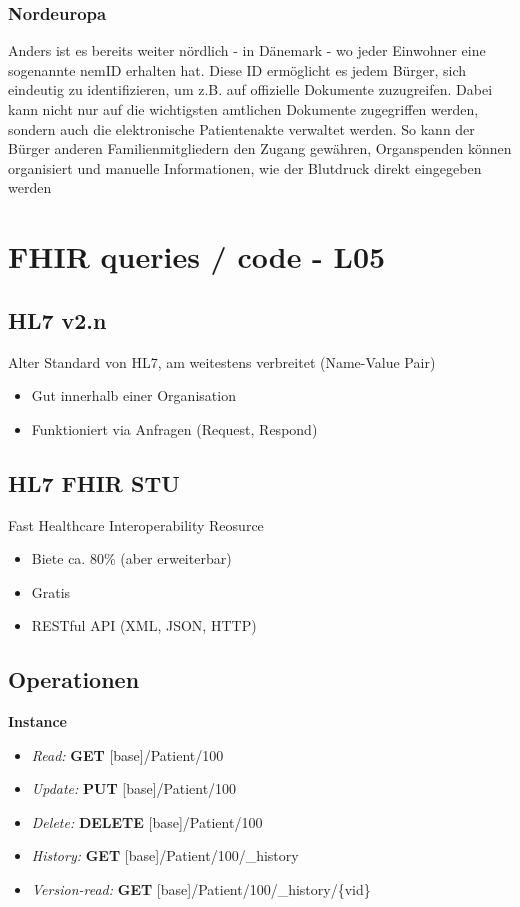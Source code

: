 \documentclass{report}
\theoremstyle{definition}
\theoremstyle{example}
\begin{document}
\subsection{Nordeuropa}
Anders ist es bereits weiter nördlich - in Dänemark - wo jeder Einwohner eine sogenannte nemID erhalten hat. Diese ID ermöglicht es jedem Bürger, sich eindeutig zu identifizieren, um z.B. auf offizielle Dokumente zuzugreifen. Dabei kann nicht nur auf die wichtigsten amtlichen Dokumente zugegriffen werden, sondern auch die elektronische Patientenakte verwaltet werden. So kann der Bürger anderen Familienmitgliedern den Zugang gewähren, Organspenden können organisiert und manuelle Informationen, wie der Blutdruck direkt eingegeben werden

\chapter{FHIR queries / code - L05}

\section{HL7 v2.n}
Alter Standard von HL7, am weitestens verbreitet (Name-Value Pair)
\begin{itemize}
   \item Gut innerhalb einer Organisation
   \item Funktioniert via Anfragen (Request, Respond)
\end{itemize}

\section{HL7 FHIR STU}
Fast Healthcare Interoperability Reosurce
\begin{itemize}
   \item Biete ca. 80\% (aber erweiterbar)
   \item Gratis
   \item RESTful API (XML, JSON, HTTP)
\end{itemize}

\section{Operationen}

\textbf{Instance}
\begin{itemize}
   \item \textit{Read:} \textbf{GET} [base]/Patient/100
   \item \textit{Update:} \textbf{PUT} [base]/Patient/100
   \item \textit{Delete:} \textbf{DELETE} [base]/Patient/100
   \item \textit{History:} \textbf{GET} [base]/Patient/100/\_history
   \item \textit{Version-read:} \textbf{GET} [base]/Patient/100/\_history/\{vid\}
\end{itemize}
\end{document}
